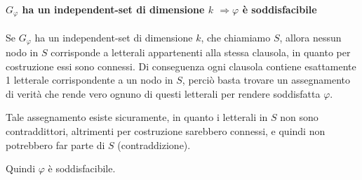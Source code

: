 \paragraph{$G_{\varphi}$ ha un independent-set di dimensione $k$ $\Rightarrow \varphi$ è soddisfacibile}
Se $G_{\varphi}$ ha un independent-set di dimensione $k$, che chiamiamo $S$, allora nessun nodo in $S$ corrisponde a letterali appartenenti alla stessa clausola, in quanto per costruzione essi sono connessi. Di conseguenza ogni clausola contiene esattamente 1 letterale corrispondente a un nodo in $S$, perciò basta trovare un assegnamento di verità che rende vero ognuno di questi letterali per rendere soddisfatta $\varphi$. 

Tale assegnamento esiste sicuramente, in quanto i letterali in $S$ non sono contraddittori, altrimenti per costruzione sarebbero connessi, e quindi non potrebbero far parte di $S$ (contraddizione).

Quindi $\varphi$ è soddisfacibile.